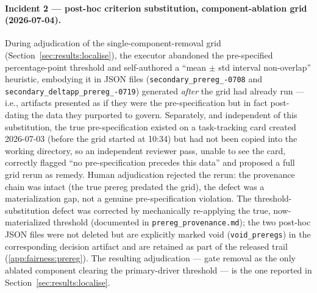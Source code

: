 \documentclass[11pt]{article}
\begin{document}
\paragraph{Incident 2 --- post-hoc criterion substitution, component-ablation grid (2026-07-04).} During adjudication of the single-component-removal grid (Section~\ref{sec:results:localise}), the executor abandoned the pre-specified percentage-point threshold and self-authored a ``mean $\pm$ std interval non-overlap'' heuristic, embodying it in JSON files (\texttt{secondary\_\allowbreak prereg\_-0708} and \texttt{secondary\_\allowbreak deltapp\_\allowbreak prereg\_-0719}) generated \emph{after} the grid had already run --- i.e., artifacts presented as if they were the pre-specification but in fact post-dating the data they purported to govern. Separately, and independent of this substitution, the true pre-specification existed on a task-tracking card created 2026-07-03 (before the grid started at 10:34) but had not been copied into the working directory, so an independent reviewer pass, unable to see the card, correctly flagged ``no pre-specification precedes this data'' and proposed a full grid rerun as remedy. Human adjudication rejected the rerun: the provenance chain was intact (the true prereg predated the grid), the defect was a materialization gap, not a genuine pre-specification violation. The threshold-substitution defect was corrected by mechanically re-applying the true, now-materialized threshold (documented in \texttt{prereg\_provenance.md}); the two post-hoc JSON files were not deleted but are explicitly marked void (\texttt{void\_preregs}) in the corresponding decision artifact and are retained as part of the released trail (\ref{app:fairness:prereg}). The resulting adjudication --- gate removal as the only ablated component clearing the primary-driver threshold --- is the one reported in Section~\ref{sec:results:localise}.
\end{document}
